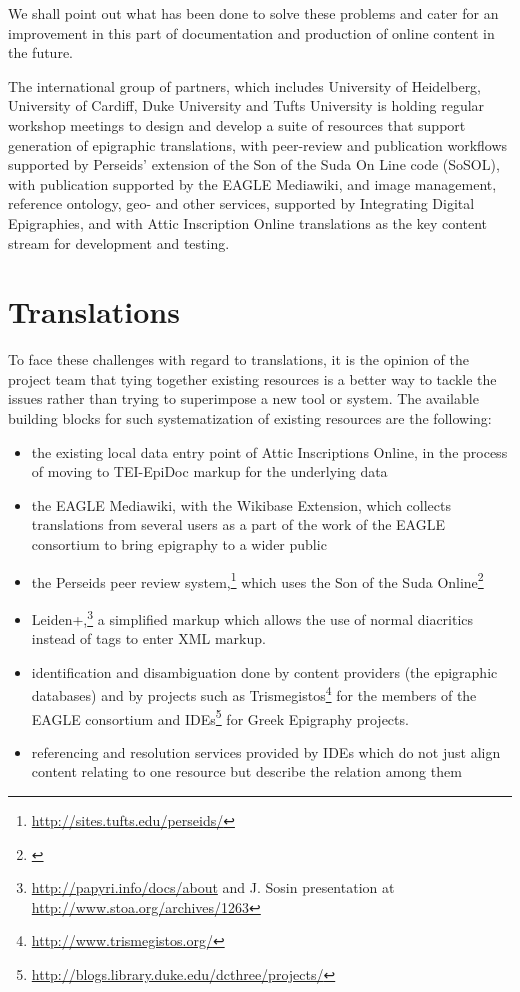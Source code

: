 \documentclass[amsthm,ebook]{saparticle}
\begin{document}
We shall point out what has been done to solve these problems and cater for an improvement in this part of documentation and production of online content in the future.

The international group of partners, which includes University of Heidelberg, University of Cardiff, Duke University and Tufts University is holding regular workshop meetings to design and  develop a suite of resources that support generation of epigraphic translations, with peer-review and publication workflows supported by Perseids’ extension of the Son of the Suda On Line code (SoSOL), with publication supported by the EAGLE Mediawiki, and image management, reference ontology, geo- and other services, supported by Integrating Digital Epigraphies, and with Attic Inscription Online translations as the key content stream for development and testing.


\section{Translations}
\noindent To face these challenges with regard to translations, it is the opinion of the project team that tying together existing resources is a better way to tackle the issues rather than trying to superimpose a new tool or system. The available building blocks for such systematization of existing resources are the following:

\begin{itemize}
\item the existing local data entry point of Attic Inscriptions Online, in the process of moving to TEI-EpiDoc markup for the underlying data
\item the EAGLE Mediawiki, with the Wikibase Extension, which collects translations from several users as a part of the work of the EAGLE consortium to bring epigraphy to a wider public 
\item the Perseids peer review system,\footnote{\url{http://sites.tufts.edu/perseids/}} which uses the Son of the Suda Online\footnote{\citet{Baumann2013}}
\item Leiden+,\footnote{\url{http://papyri.info/docs/about} and J. Sosin presentation at \url{http://www.stoa.org/archives/1263}} a simplified markup which allows the use of normal diacritics instead of tags to enter XML markup. 
\item identification and disambiguation done by content providers (the epigraphic databases) and by projects such as Trismegistos\footnote{\url{http://www.trismegistos.org/}} for the members of the EAGLE consortium and IDEs\footnote{\url{http://blogs.library.duke.edu/dcthree/projects/}} for Greek Epigraphy projects.
\item referencing and resolution services provided by IDEs which do not just align content relating to one resource but describe the relation among them
\end{itemize}
\end{document}
